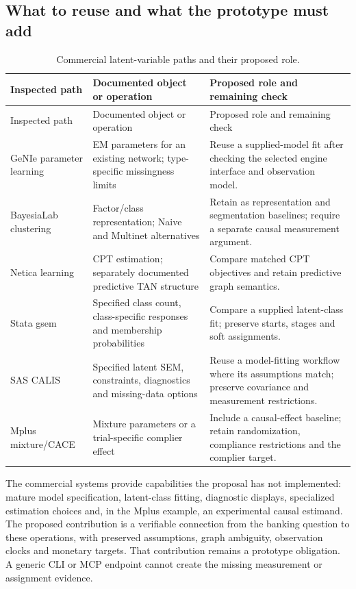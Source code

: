 \hypertarget{what-to-reuse-and-what-the-prototype-must-add}{%
\subsection{What to reuse and what the prototype must
add}\label{what-to-reuse-and-what-the-prototype-must-add}}

\begin{longtable}{@{}P{.22\linewidth}P{.35\linewidth}P{.35\linewidth}@{}}
\caption{Commercial latent-variable paths and their proposed role.}
\label{exec13:latent-commercial-table}\\
\toprule
Inspected path & Documented object or operation & Proposed role and remaining check \\
\midrule
\endfirsthead
\toprule
Inspected path & Documented object or operation & Proposed role and remaining check \\
\midrule
\endhead
GeNIe parameter learning & EM parameters for an existing network; type-specific missingness limits & Reuse a supplied-model fit after checking the selected engine interface and observation model. \\
BayesiaLab clustering & Factor/class representation; Naive and Multinet alternatives & Retain as representation and segmentation baselines; require a separate causal measurement argument. \\
Netica learning & CPT estimation; separately documented predictive TAN structure & Compare matched CPT objectives and retain predictive graph semantics. \\
Stata gsem & Specified class count, class-specific responses and membership probabilities & Compare a supplied latent-class fit; preserve starts, stages and soft assignments. \\
SAS CALIS & Specified latent SEM, constraints, diagnostics and missing-data options & Reuse a model-fitting workflow where its assumptions match; preserve covariance and measurement restrictions. \\
Mplus mixture/CACE & Mixture parameters or a trial-specific complier effect & Include a causal-effect baseline; retain randomization, compliance restrictions and the complier target. \\
\bottomrule
\end{longtable}

The commercial systems provide capabilities the proposal has not
implemented: mature model specification, latent-class fitting,
diagnostic displays, specialized estimation choices and, in the Mplus
example, an experimental causal estimand. The proposed contribution is a
verifiable connection from the banking question to these operations,
with preserved assumptions, graph ambiguity, observation clocks and
monetary targets. That contribution remains a prototype obligation. A
generic CLI or MCP endpoint cannot create the missing measurement or
assignment evidence.

